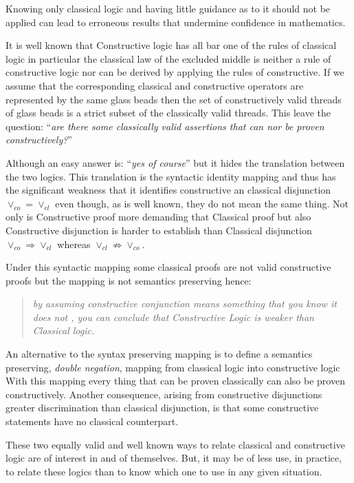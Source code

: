 Knowing only classical logic and having little guidance as to it should not be applied can lead to erroneous results that undermine confidence in mathematics.


It is well known that Constructive logic has  all bar one of the rules of classical logic in particular  the classical law of the excluded middle is neither a rule of  constructive logic nor can be derived by applying the rules of constructive.  If we assume that the corresponding classical and constructive operators   are represented by the same glass beads then the set of  constructively valid threads of glass beads is a strict subset of the classically valid threads. This leave the question: ``\emph{are there some classically valid assertions that can nor be proven constructively?}'' 



  Although an easy answer is:  ``\emph{yes of course}''  but it hides the translation between the two logics. This translation is the syntactic identity mapping  and thus has the significant weakness that it identifies constructive an classical disjunction  $\vee_{co}=\vee_{cl}$ even though, as is well known, they do not mean the same thing.  Not only is Constructive proof more demanding that Classical proof  but also Constructive disjunction is harder to establish than Classical disjunction $\vee_{co}\Rightarrow \vee_{cl} $ whereas $\vee_{cl}\not\Rightarrow\vee_{co} $.

Under this syntactic mapping 
some classical proofs are not valid constructive proofs but the mapping is not semantics preserving hence:
\begin{quotation}
\emph{by  assuming  constructive conjunction means something that you know it does not , you can conclude that Constructive Logic is weaker than Classical logic.} 
\end{quotation}


An alternative to the syntax preserving mapping is to define a semantics preserving, \emph{double negation}, mapping from classical logic into constructive logic \cite{} With this mapping every thing that can be proven classically can also be proven constructively. Another consequence, arising from constructive disjunctions  greater discrimination than classical disjunction,  is  that  some constructive statements have no classical counterpart. 

These two equally valid and well known ways to relate classical and constructive logic are of interest in and of themselves. But, it may be of less use, in practice,  to relate these logics than  to know which one to use in any given situation. 



